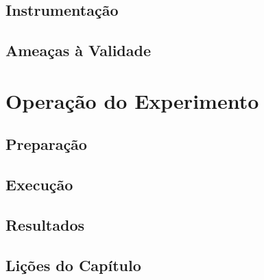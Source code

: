 \subsection{Instrumentação}
\subsection{Ameaças à Validade}

\section{Operação do Experimento}
\subsection{Preparação}
\subsection{Execução}

\subsection{Resultados}

\subsection{Lições do Capítulo}